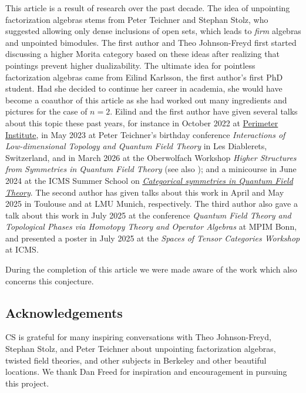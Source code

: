 \documentclass[10pt, reqno, twoside
, final
]{amsart}
\numberwithin{equation}{subsection}%
\theoremstyle{definition}
\theoremstyle{definition}
\theoremstyle{definition}
\theoremstyle{definition}
\theoremstyle{definition}
\theoremstyle{definition}
\theoremstyle{definition}
\theoremstyle{definition}
\theoremstyle{definition}
\theoremstyle{plain}
\theoremstyle{definition}
\theoremstyle{plain}
\theoremstyle{definition}
\theoremstyle{plain}
\theoremstyle{definition}
\theoremstyle{definition}
\theoremstyle{plain}
\theoremstyle{plain}
\theoremstyle{definition}
\theoremstyle{plain}
\theoremstyle{plain}
\theoremstyle{plain}
\begin{document}
This article is a result of research over the past decade. The idea of unpointing factorization algebras stems from Peter Teichner and Stephan Stolz, who suggested allowing only dense inclusions of open sets, which leads to {\em firm} algebras and unpointed bimodules.
The first author and Theo Johnson-Freyd first started discussing a higher Morita category based on these ideas after realizing that pointings prevent higher dualizability.
The ultimate idea for pointless factorization algebras came from Eilind Karlsson, the first author's first PhD student.
Had she decided to continue her career in academia, she would have become a coauthor of this article as she had worked out many ingredients and pictures for the case of $n=2$.
Eilind and the first author have given several talks about this topic these past years, for instance in October 2022 at \href{https://pirsa.org/22100102}{Perimeter Institute}, in May 2023 at Peter Teichner's birthday conference {\em Interactions of Low-dimensional Topology and Quantum Field Theory} in Les Diablerets, Switzerland, and in March 2026 at the Oberwolfach Workshop {\em Higher Structures from Symmetries in Quantum Field Theory} (see also \cite{OWR});
and a minicourse in June 2024 at the ICMS Summer School on \href{https://icms.ac.uk/archive/workshop/categorical-symmetries-in-quantum-field-theory-summer-school/}{\em Categorical symmetries in Quantum Field Theory}. The second author has given talks about this work in April and May 2025 in Toulouse and at LMU Munich, respectively. The third author also gave a talk about this work in July 2025 at the conference {\em Quantum Field Theory and Topological Phases via Homotopy Theory and Operator Algebras} at MPIM Bonn, and presented a poster in July 2025 at the {\em Spaces of Tensor Categories Workshop} at ICMS.



During the completion of this article we were made aware of the work \cite{Vazquez} which also concerns this conjecture.



\subsection{Acknowledgements}

CS is grateful for many inspiring conversations with Theo Johnson-Freyd, Stephan Stolz, and Peter Teichner about unpointing factorization algebras, twisted field theories, and other subjects in Berkeley and other beautiful locations. We thank Dan Freed for inspiration and encouragement in pursuing this project.
\end{document}
